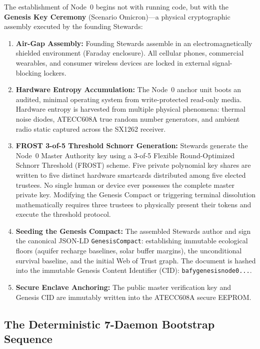 The establishment of Node~0 begins not with running code, but with the \textbf{Genesis Key Ceremony} (Scenario Omicron)---a physical cryptographic assembly executed by the founding Stewards:
\begin{enumerate}
    \item \textbf{Air-Gap Assembly:} Founding Stewards assemble in an electromagnetically shielded environment (Faraday enclosure). All cellular phones, commercial wearables, and consumer wireless devices are locked in external signal-blocking lockers.
    \item \textbf{Hardware Entropy Accumulation:} The Node~0 anchor unit boots an audited, minimal operating system from write-protected read-only media. Hardware entropy is harvested from multiple physical phenomena: thermal noise diodes, ATECC608A true random number generators, and ambient radio static captured across the SX1262 receiver.
    \item \textbf{FROST 3-of-5 Threshold Schnorr Generation:} Stewards generate the Node~0 Master Authority key using a 3-of-5 Flexible Round-Optimized Schnorr Threshold (FROST) scheme. Five private polynomial key shares are written to five distinct hardware smartcards distributed among five elected trustees. No single human or device ever possesses the complete master private key. Modifying the Genesis Compact or triggering terminal dissolution mathematically requires three trustees to physically present their tokens and execute the threshold protocol.
    \item \textbf{Seeding the Genesis Compact:} The assembled Stewards author and sign the canonical JSON-LD \texttt{GenesisCompact}: establishing immutable ecological floors (aquifer recharge baselines, solar buffer margins), the unconditional survival baseline, and the initial Web of Trust graph. The document is hashed into the immutable Genesis Content Identifier (CID): \texttt{bafygenesisnode0...}.
    \item \textbf{Secure Enclave Anchoring:} The public master verification key and Genesis CID are immutably written into the ATECC608A secure EEPROM.
\end{enumerate}

\subsection{The Deterministic 7-Daemon Bootstrap Sequence}
\label{subsec:daemon_bootstrap}

